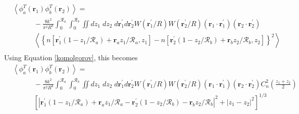 \begin{equation}\label{tphase_n2}
\begin{aligned}
&\left\langle \phi^{T}_{a}\left(\boldsymbol{r}_{1}\right) \phi^{T}_{b}\left(\boldsymbol{r}_{2}\right)\right\rangle = \\
&\quad\quad\quad
-\frac{8k^{2}}{\pi^{2}R^{8}} \int_{0}^{\mathcal{R}_{a}}  \int_{0}^{\mathcal{R}_{b}} \iint dz_{1} \; dz_{2} \; d\boldsymbol{r}^{\prime}_{1}d\boldsymbol{r}^{\prime}_{2} W(\boldsymbol{r}^{\prime}_{1}/R) W(\boldsymbol{r}^{\prime}_{2}/R)
\left(\boldsymbol{r}_{1} \cdot \boldsymbol{r}^{\prime}_{1}\right)
\left(\boldsymbol{r}_{2} \cdot \boldsymbol{r}^{\prime}_{2}\right)
\\
&\quad\quad\quad
\left\langle \left\{ n\left[\boldsymbol{r}^{\prime}_{1}\left(1-z_{1}/\mathcal{R}_{a}\right) + \boldsymbol{r}_{a} z_{1}/\mathcal{R}_{a}, z_{1}\right] - 
 n\left[\boldsymbol{r}^{\prime}_{2}\left(1-z_{2}/\mathcal{R}_{b}\right) + \boldsymbol{r}_{b} z_{2}/\mathcal{R}_{b}, z_{2}\right]\right\}^{2} \right\rangle \\
\end{aligned}
\end{equation}
Using Equation \ref{komolgorov}, this becomes
\begin{equation}\label{tphase_n3}
\begin{aligned}
&\left\langle \phi^{T}_{a}\left(\boldsymbol{r}_{1}\right) \phi^{T}_{b}\left(\boldsymbol{r}_{2}\right)\right\rangle = \\
&\quad\quad\quad
-\frac{8k^{2}}{\pi^{2}R^{8}} \int_{0}^{\mathcal{R}_{a}}  \int_{0}^{\mathcal{R}_{b}} \iint dz_{1} \; dz_{2} \; d\boldsymbol{r}^{\prime}_{1}d\boldsymbol{r}^{\prime}_{2} W(\boldsymbol{r}^{\prime}_{1}/R) W(\boldsymbol{r}^{\prime}_{2}/R)
\left(\boldsymbol{r}_{1} \cdot \boldsymbol{r}^{\prime}_{1}\right)
\left(\boldsymbol{r}_{2} \cdot \boldsymbol{r}^{\prime}_{2}\right)
C_{n}^{2}\left(\frac{z_{1} + z_{2}}{2}\right) 
\\
&\quad\quad\quad
\left[ \left\vert \boldsymbol{r}^{\prime}_{1}\left(1-z_{1}/\mathcal{R}_{a}\right) + \boldsymbol{r}_{a} z_{1}/\mathcal{R}_{a} - 
 \boldsymbol{r}^{\prime}_{2}\left(1-z_{2}/\mathcal{R}_{b}\right) - \boldsymbol{r}_{b} z_{2}/\mathcal{R}_{b}\right\vert^{2} + 
\left\vert z_{1} - z_{2} \right\vert^{2} \right]^{1/3}
\end{aligned}
\end{equation}

